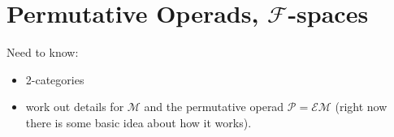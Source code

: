 \documentclass{article}
\begin{document}
\newpage

\section{Permutative Operads, $\mathcal{F}$-spaces}

Need to know:
\begin{itemize}
    \item 2-categories
    \item work out details for $\mathcal{M}$ and the permutative operad $\mathcal{P}=\mathcal{EM}$ (right now there is some basic idea about how it works).
\end{itemize}
\end{document}
